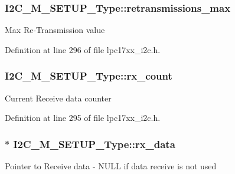 \subsubsection[{\texorpdfstring{retransmissions\+\_\+max}{retransmissions_max}}]{ I2\+C\+\_\+\+M\+\_\+\+S\+E\+T\+U\+P\+\_\+\+Type\+::retransmissions\+\_\+max}\hypertarget{struct_i2_c___m___s_e_t_u_p___type_aa670cdabc0355d818afc15c788db63bc}{}\label{struct_i2_c___m___s_e_t_u_p___type_aa670cdabc0355d818afc15c788db63bc}
Max Re-\/\+Transmission value 

Definition at line 296 of file lpc17xx\+\_\+i2c.\+h.

\subsubsection[{\texorpdfstring{rx\+\_\+count}{rx_count}}]{ I2\+C\+\_\+\+M\+\_\+\+S\+E\+T\+U\+P\+\_\+\+Type\+::rx\+\_\+count}\hypertarget{struct_i2_c___m___s_e_t_u_p___type_a64e0b05e44731d2c54ae082274db25d1}{}\label{struct_i2_c___m___s_e_t_u_p___type_a64e0b05e44731d2c54ae082274db25d1}
Current Receive data counter 

Definition at line 295 of file lpc17xx\+\_\+i2c.\+h.

\subsubsection[{\texorpdfstring{rx\+\_\+data}{rx_data}}]{$\ast$ I2\+C\+\_\+\+M\+\_\+\+S\+E\+T\+U\+P\+\_\+\+Type\+::rx\+\_\+data}\hypertarget{struct_i2_c___m___s_e_t_u_p___type_ad4ec2a23f5fb9d6896d8fb7549eb8a02}{}\label{struct_i2_c___m___s_e_t_u_p___type_ad4ec2a23f5fb9d6896d8fb7549eb8a02}
Pointer to Receive data -\/ N\+U\+LL if data receive is not used 

